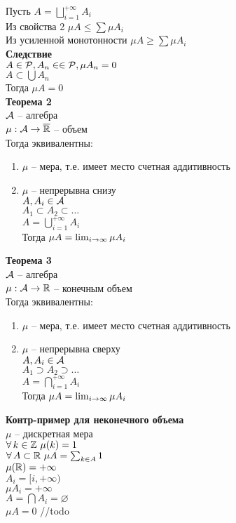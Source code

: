 \documentclass[12pt]{article}
\begin{document}
Пусть $A = \bigsqcup_{i=1}^{+\infty} A_i$\\
Из свойства 2 $\mu A \leq \sum \mu A_i$\\
Из усиленной монотонности $\mu A \geq \sum \mu A_i$\\
\textbf{Следствие}\\
$A \in \mathcal P, A_n \in \in \mathcal P, \mu A_n = 0$\\
$A \subset \bigcup A_n$\\
Тогда $\mu A = 0$\\
\textbf{Теорема 2}\\
$\mathcal A$ -- алгебра\\
$\mu: \mathcal A \rightarrow \overline{\mathbb{R}}$ -- объем\\
Тогда эквивалентны:
\begin{enumerate}
    \item $\mu$ -- мера, т.е. имеет место счетная аддитивность
    \item $\mu$ -- непрерывна снизу\\
    $A, A_i \in \mathcal A$\\
    $A_1 \subset A_2 \subset \ldots$\\
    $A = \bigcup_{i=1}^{+\infty} A_i$\\
    Тогда $\mu A = \lim_{i\rightarrow \infty} \mu A_i$
\end{enumerate}
\textbf{Теорема 3}\\
$\mathcal A$ -- алгебра\\
$\mu: \mathcal A \rightarrow \mathbb{R}$ -- конечным объем\\
Тогда эквивалентны:
\begin{enumerate}
    \item $\mu$ -- мера, т.е. имеет место счетная аддитивность
    \item $\mu$ -- непрерывна сверху\\
    $A, A_i \in \mathcal A$\\
    $A_1 \supset A_2 \supset \ldots$\\
    $A = \bigcap_{i=1}^{+\infty} A_i$\\
    Тогда $\mu A = \lim_{i\rightarrow \infty} \mu A_i$
\end{enumerate}
\textbf{Контр-пример для неконечного объема}\\
$\mu$ -- дискретная мера\\
$\forall\, k \in \mathbb{Z}\ \mu(k) = 1$\\
$\forall\, A \subset \mathbb{R}\ \mu A = \sum_{k\in A} 1$\\
$\mu(\mathbb{R}) = +\infty$\\
$A_i = [i, +\infty)$\\
$\mu A_i = +\infty$\\
$A = \bigcap A_i = \varnothing$\\
$\mu A = 0$
//todo
\end{document}
